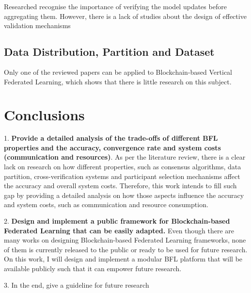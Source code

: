 Researched recognise the importance of verifying the model updates before aggregating them. However, there is a lack of studies about the design of effective validation mechanisms \cite{10.48550/arxiv.2110.02182}

\subsection{Data Distribution, Partition and Dataset}



 Only one of the reviewed papers can be applied to Blockchain-based Vertical Federated Learning, which shows that there is little research on this subject.

\section{Conclusions}

1. \textbf{Provide a detailed analysis of the trade-offs of different BFL properties and the accuracy, convergence rate and system costs (communication and resources)}. As per the literature review, there is a clear lack on research on how different properties, such as consensus algorithms, data partition, cross-verification systems and participant selection mechanisms affect the accuracy and overall system costs. Therefore, this work intends to fill such gap by providing a detailed analysis on how those aspects influence the accuracy and system costs, such as communication and resource consumption.

2. \textbf{Design and implement a public framework for Blockchain-based Federated Learning that can be easily adapted.} Even though there are many works on designing Blockchain-based Federated Learning frameworks, none of them is currently released to the public or ready to be used for future research. On this work, I will design and implement a modular BFL platform that will be available publicly such that it can empower future research.

3. In the end, give a guideline for future research